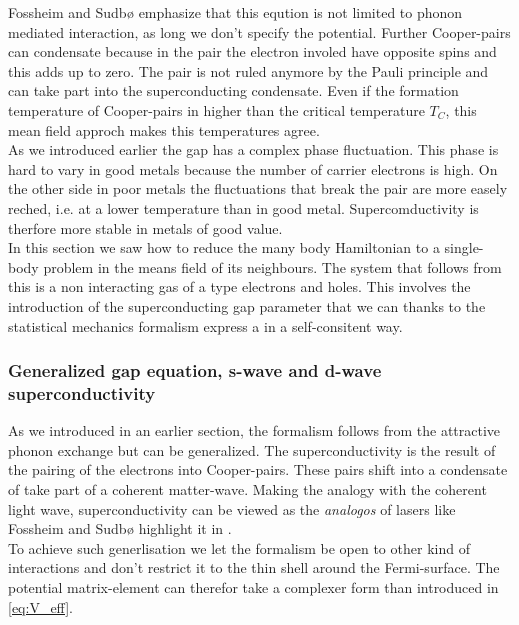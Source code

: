 \documentclass[../main.tex]{subfile}
\begin{document}
Fossheim and Sudbø \cite{FossheimSudbo2004} emphasize that this eqution is not limited to phonon mediated interaction, as long we
don't specify the potential. Further Cooper-pairs can condensate because in the pair the electron involed have opposite
spins and this adds up to zero. The pair is not ruled anymore by the Pauli principle and can take part into the superconducting condensate. 
Even if the formation temperature of Cooper-pairs in higher than the critical temperature $T_C$, this mean field approch makes this temperatures agree.\\

As we introduced earlier the gap has a complex phase fluctuation. This phase is hard to vary in good metals because the number of carrier electrons is high.
On the other side in poor metals the fluctuations that break the pair are more easely reched, i.e. at a lower temperature than in good metal. Supercomductivity
is therfore more stable in metals of good value.\\

In this section we saw how to reduce the many body Hamiltonian to a single-body problem in the means field of its neighbours. The system that follows from this
is a non interacting gas of a type electrons and holes. This involves the introduction of the 
superconducting gap parameter that we can thanks to the statistical mechanics formalism express a in a self-consitent way.


\subsubsection{Generalized gap equation, s-wave and d-wave superconductivity}
As we introduced in an earlier section, the formalism follows from the attractive phonon exchange but can be generalized. The superconductivity
is the result of the pairing of the electrons into Cooper-pairs. These pairs shift into a condensate of take part of a coherent matter-wave.
Making the analogy with the coherent light wave, superconductivity can be viewed as the \textit{analogos} of lasers like Fossheim and Sudbø 
highlight it in \cite{FossheimSudbo2004}.\\

To achieve such generlisation we let the formalism be open to other kind of interactions and don't restrict it to the thin shell around the Fermi-surface.
The potential matrix-element can therefor take a complexer form than introduced in \ref{eq:V_eff}.\\
\end{document}
